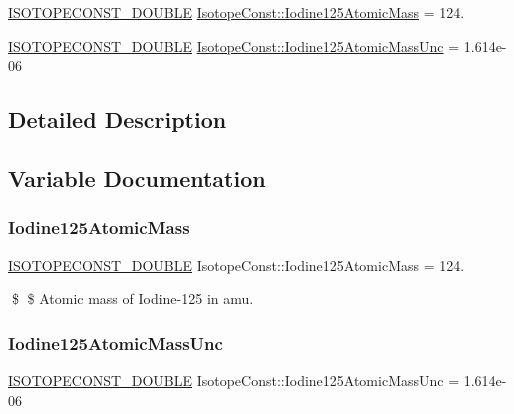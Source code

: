 \begin{DoxyCompactItemize}
\item 
\mbox{\hyperlink{group___isotope_const-_macros_ga8f45a7272ce02c0b4c65c44636ed719a}{I\+S\+O\+T\+O\+P\+E\+C\+O\+N\+S\+T\+\_\+\+D\+O\+U\+B\+LE}} \mbox{\hyperlink{group___isotope_const-_iodine-_i125_gaafc1ecdfcc58cbe731415164b0fc27d5}{Isotope\+Const\+::\+Iodine125\+Atomic\+Mass}} = 124.
\item 
\mbox{\hyperlink{group___isotope_const-_macros_ga8f45a7272ce02c0b4c65c44636ed719a}{I\+S\+O\+T\+O\+P\+E\+C\+O\+N\+S\+T\+\_\+\+D\+O\+U\+B\+LE}} \mbox{\hyperlink{group___isotope_const-_iodine-_i125_ga0083505facb683ca054d61d5e68f0d25}{Isotope\+Const\+::\+Iodine125\+Atomic\+Mass\+Unc}} = 1.\+614e-\/06
\end{DoxyCompactItemize}


\subsection{Detailed Description}


\subsection{Variable Documentation}
\mbox{\label{group___isotope_const-_iodine-_i125_gaafc1ecdfcc58cbe731415164b0fc27d5}} 
\subsubsection{\texorpdfstring{Iodine125\+Atomic\+Mass}{Iodine125AtomicMass}}
{\footnotesize\ttfamily \mbox{\hyperlink{group___isotope_const-_macros_ga8f45a7272ce02c0b4c65c44636ed719a}{I\+S\+O\+T\+O\+P\+E\+C\+O\+N\+S\+T\+\_\+\+D\+O\+U\+B\+LE}} Isotope\+Const\+::\+Iodine125\+Atomic\+Mass = 124.}

\$ \$ Atomic mass of Iodine-\/125 in amu. \mbox{\label{group___isotope_const-_iodine-_i125_ga0083505facb683ca054d61d5e68f0d25}} 
\subsubsection{\texorpdfstring{Iodine125\+Atomic\+Mass\+Unc}{Iodine125AtomicMassUnc}}
{\footnotesize\ttfamily \mbox{\hyperlink{group___isotope_const-_macros_ga8f45a7272ce02c0b4c65c44636ed719a}{I\+S\+O\+T\+O\+P\+E\+C\+O\+N\+S\+T\+\_\+\+D\+O\+U\+B\+LE}} Isotope\+Const\+::\+Iodine125\+Atomic\+Mass\+Unc = 1.\+614e-\/06}

